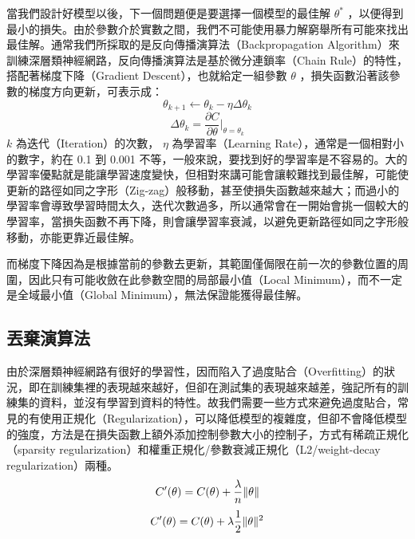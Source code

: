 當我們設計好模型以後，下一個問題便是要選擇一個模型的最佳解 $\theta^{\ast}$ ，以便得到最小的損失。由於參數介於實數之間，我們不可能使用暴力解窮舉所有可能來找出最佳解。通常我們所採取的是反向傳播演算法（Backpropagation Algorithm）來訓練深層類神經網路，反向傳播演算法是基於微分連鎖率（Chain Rule）的特性，搭配著梯度下降（Gradient Descent），也就給定一組參數 $\theta$ ，損失函數沿著該參數的梯度方向更新，可表示成：
\begin{equation}
    \theta_{k+1} \leftarrow \theta_k - \eta\Delta\theta_k
\end{equation}
\begin{equation}
    \Delta\theta_k = \frac{\partial C}{\partial\theta}\biggr|_{\theta = \theta_k}
\end{equation}
$k$ 為迭代（Iteration）的次數， $\eta$ 為學習率（Learning Rate），通常是一個相對小的數字，約在 0.1 到 0.001 不等，一般來說，要找到好的學習率是不容易的。大的學習率優點就是能讓學習速度變快，但相對來講可能會讓較難找到最佳解，可能使更新的路徑如同之字形（Zig-zag）般移動，甚至使損失函數越來越大；而過小的學習率會導致學習時間太久，迭代次數過多，所以通常會在一開始會挑一個較大的學習率，當損失函數不再下降，則會讓學習率衰減，以避免更新路徑如同之字形般移動，亦能更靠近最佳解。

而梯度下降因為是根據當前的參數去更新，其範圍僅侷限在前一次的參數位置的周圍，因此只有可能收斂在此參數空間的局部最小值（Local Minimum），而不一定是全域最小值（Global Minimum），無法保證能獲得最佳解。

\subsection{丟棄演算法}
由於深層類神經網路有很好的學習性，因而陷入了過度貼合（Overfitting）的狀況，即在訓練集裡的表現越來越好，但卻在測試集的表現越來越差，強記所有的訓練集的資料，並沒有學習到資料的特性。故我們需要一些方式來避免過度貼合，常見的有使用正規化（Regularization），可以降低模型的複雜度，但卻不會降低模型的強度，方法是在損失函數上額外添加控制參數大小的控制子，方式有稀疏正規化（sparsity regularization）和權重正規化/參數衰減正規化（L2/weight-decay regularization）兩種。
\begin{equation}
    C'(\theta) = C(\theta) + \frac{\lambda}{n}\Arrowvert\theta\Arrowvert
\end{equation}
\begin{equation}
    C'(\theta) = C(\theta) + \lambda\frac{1}{2}\Arrowvert\theta\Arrowvert^2
\end{equation}


